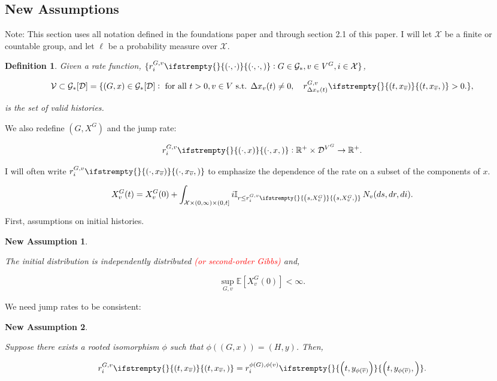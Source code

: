 \documentclass[12pt]{article}
\newcommand{\mb}{\mathbb}
\newcommand{\mc}{\mathcal}
\newcommand{\ra}{\rightarrow}
\newcommand{\ov}{\overline}
\newcommand{\te}{\text}
\newcommand{\tr}{\textcolor{red}}
\newcommand{\ex}[1]{\mb{E}\left[#1\right]}			%
\newcommand{\cad}{\mc{D}}							%
\newcommand{\valid}{\mc{V}}							%
\newcommand{\sta}{\mc{X}}							%
\newcommand{\cl}[1]{\ov{#1}}						%
\newcommand{\Xf}{X}									%
\newcommand{\poiss}{N}								%
\newcommand{\Sm}{\ell}								%
\newcommand{\rate}{r}								%
\newcommand{\xf}{x}									%
\newcommand{\xg}{y}									%
\newcommand{\poissv}[1]{_{#1}}						%
\newcommand{\vind}[1]{_{#1}}						%
\newcommand{\tme}[1]{(#1)}							%
\newcommand{\gind}[1]{^{#1}}						%
\newcommand{\stpara}[1]{_{#1}}						%
\newcommand{\gvpara}[2]{^{#1,#2}}					%
\newcommand{\Gs}{\mc{G}_\ast}						%
\newcommand{\tmepro}[3]{
\ifstrempty{#3}{
	\left(#1,#2\right)}{
	\left(#1,#2,#3\right)}}							%
\renewcommand{\sp}[1]{[#1]}							%
\newtheorem{defn}[thms]{Definition}
\newtheorem{nassu}{New Assumption}
\begin{document}
\subsection{New Assumptions}
\label{na}

Note: This section uses all notation defined in the foundations paper and through section 2.1 of this paper. I will let \(\sta\) be a finite or countable group, and let \(\Sm\) be a probability measure over \(\sta\).

\begin{defn}
\label{na::valid}
Given a rate function, \(\{\rate\gvpara{G}{v}\stpara{i}\tmepro{\cdot}{\cdot}{}:G \in \Gs,v \in V\gind{G}, i \in \sta\}\),

\[\valid \subset \Gs\sp{\cad} = \{(G,\xf)\in \Gs\sp{\cad}: \te{ for all }t>0,v\in V\te{ s.t. } \Delta \xf\vind{v}\tme{t} \neq 0,\quad \rate\gvpara{G}{v}\stpara{\Delta\xf\vind{v}\tme{t}}\tmepro{t}{\xf\vind{\cl{v}}}{} > 0.\},\]

is the set of \emph{valid histories}.
\end{defn}

We also redefine \((G,\Xf\gind{G})\) and the jump rate:

\[\rate\gvpara{G}{v}\stpara{i}\tmepro{\cdot}{\xf}{}: \mb{R}^+\times \cad^{V\gind{G}} \ra \mb{R}^+.\]

I will often write \(\rate\gvpara{G}{v}\stpara{i}\tmepro{\cdot}{\xf\vind{\cl{v}}}{}\) to emphasize the dependence of the rate on a subset of the components of \(\xf\).

\[\Xf\gind{G}\vind{v}\tme{t} = \Xf\gind{G}\vind{v}\tme{0} + \int_{\sta\times (0,\infty)\times (0,t]} i\mb{I}_{r \leq \rate\gvpara{G}{v}\stpara{i}\tmepro{s}{\Xf\gind{G}\vind{v}}{}}\,\poiss\poissv{v}(ds,dr,di).\]

First, assumptions on initial histories. 

\begin{nassu}
\label{na::start}

The initial distribution is independently distributed \tr{(or second-order Gibbs)} and,

\[\sup_{G,v} \ex{\Xf\gind{G}\vind{v}\tme{0}} < \infty.\]
\end{nassu}

We need jump rates to be consistent:

\begin{nassu}
\label{na::consist}

Suppose there exists a rooted isomorphism \(\phi\) such that \(\phi((G,\xf)) = (H,\xg)\). Then,

\[\rate\gvpara{G}{v}\stpara{i}\tmepro{t}{\xf\vind{\cl{v}}}{} = \rate\gvpara{\phi(G)}{\phi(v)}\stpara{i}\tmepro{t}{\xg\vind{\phi(\cl{v})}}{}.\]
\end{nassu}
\end{document}
